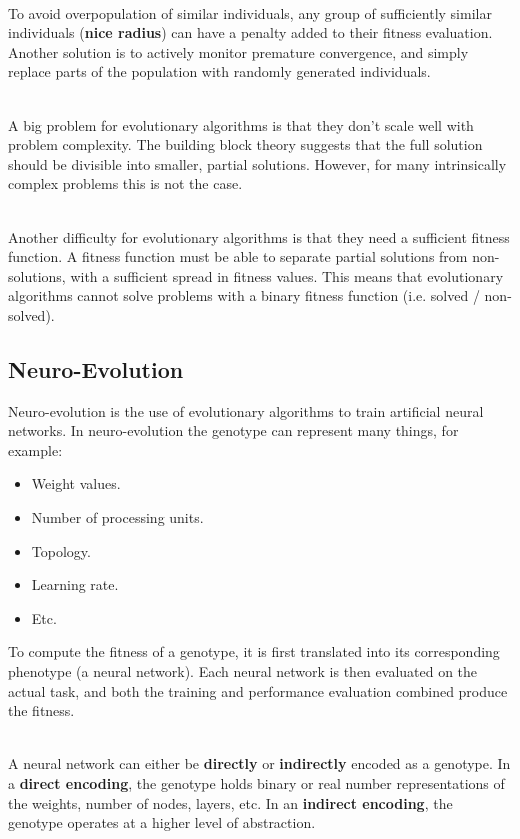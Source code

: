 \documentclass[12pt]{article}
\begin{document}
\noindent
\\
To avoid overpopulation of similar individuals, any group of sufficiently similar individuals (\textbf{nice radius}) can have a penalty added to their fitness evaluation.
Another solution is to actively monitor premature convergence, and simply replace parts of the population with randomly generated individuals.

\noindent
\\
A big problem for evolutionary algorithms is that they don't scale well with problem complexity.
The building block theory suggests that the full solution should be divisible into smaller, partial solutions.
However, for many intrinsically complex problems this is not the case.

\noindent
\\
Another difficulty for evolutionary algorithms is that they need a sufficient fitness function.
A fitness function must be able to separate partial solutions from non-solutions, with a sufficient spread in fitness values.
This means that evolutionary algorithms cannot solve problems with a binary fitness function (i.e. solved / non-solved).

\subsection{Neuro-Evolution}
Neuro-evolution is the use of evolutionary algorithms to train artificial neural networks.
In neuro-evolution the genotype can represent many things, for example:

\begin{itemize}
    \item Weight values.
    \item Number of processing units.
    \item Topology.
    \item Learning rate.
    \item Etc.
\end{itemize}

\noindent
To compute the fitness of a genotype, it is first translated into its corresponding phenotype (a neural network).
Each neural network is then evaluated on the actual task, and both the training and performance evaluation combined produce the fitness.

\noindent
\\
A neural network can either be \textbf{directly} or \textbf{indirectly} encoded as a genotype.
In a \textbf{direct encoding}, the genotype holds binary or real number representations of the weights, number of nodes, layers, etc.
In an \textbf{indirect encoding}, the genotype operates at a higher level of abstraction.
\end{document}

